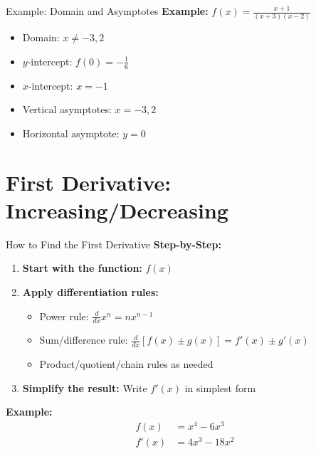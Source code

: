 \documentclass[aspectratio=169]{beamer}
\begin{document}
\begin{frame}{Example: Domain and Asymptotes}
\textbf{Example:} $f(x) = \frac{x+1}{(x+3)(x-2)}$
\begin{itemize}
    \item Domain: $x\neq -3, 2$
    \item $y$-intercept: $f(0) = -\frac{1}{6}$
    \item $x$-intercept: $x=-1$
    \item Vertical asymptotes: $x=-3, 2$
    \item Horizontal asymptote: $y=0$
\end{itemize}
\end{frame}

\section{First Derivative: Increasing/Decreasing}

\begin{frame}{How to Find the First Derivative}
\textbf{Step-by-Step:}
\begin{enumerate}
    \item \textbf{Start with the function:} $f(x)$
    \item \textbf{Apply differentiation rules:}
    \begin{itemize}
        \item Power rule: $\frac{d}{dx}x^n = nx^{n-1}$
        \item Sum/difference rule: $\frac{d}{dx}[f(x) \pm g(x)] = f'(x) \pm g'(x)$
        \item Product/quotient/chain rules as needed
    \end{itemize}
    \item \textbf{Simplify the result:} Write $f'(x)$ in simplest form
\end{enumerate}
\textbf{Example:}
\[
\begin{aligned}
    f(x) &= x^4 - 6x^3 \\
    f'(x) &= 4x^3 - 18x^2
\end{aligned}
\]
\end{frame}
\end{document}
